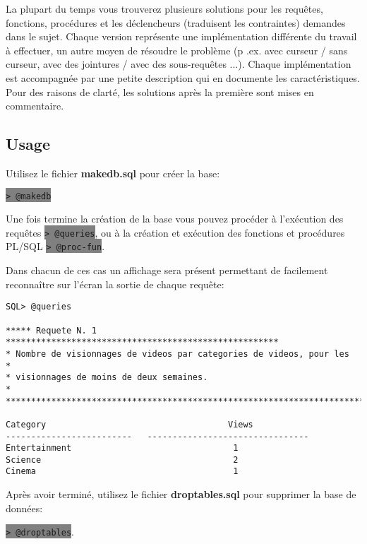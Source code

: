 \documentclass[twoside,openright,a4paper,11pt,french]{article}
\begin{document}
\bigbreak
La plupart du temps vous trouverez plusieurs solutions pour les requêtes,
fonctions, procédures et les déclencheurs (traduisent les contraintes) demandes
dans le sujet. Chaque version représente une implémentation différente du
travail à effectuer, un autre moyen de résoudre le problème (p .ex. avec
curseur / sans curseur, avec des jointures / avec des sous-requêtes ...).
Chaque implémentation est accompagnée par une petite description qui en
documente les caractéristiques. Pour des raisons de clarté, les solutions après
la première sont mises en commentaire.

\subsection{Usage}
Utilisez le fichier {\bf makedb.sql} pour créer la base:
\begin{center}
\colorbox{gray}{\lstinline[basicstyle=\ttfamily\color{black}]|> @makedb|}
\end{center}
Une fois termine la création de la base vous pouvez procéder à l'exécution des requêtes
\colorbox{gray}{\lstinline[basicstyle=\ttfamily\color{black}]|> @queries|},
ou à la création et exécution des fonctions et procédures PL/SQL
\colorbox{gray}{\lstinline[basicstyle=\ttfamily\color{black}]|> @proc-fun|}.

\smallbreak
Dans chacun de ces cas un affichage sera présent permettant de facilement
reconnaître  sur l'écran la sortie de chaque requête:

\begin{lstlisting}
SQL> @queries

***** Requete N. 1 ******************************************************
* Nombre de visionnages de videos par categories de videos, pour les            *
* visionnages de moins de deux semaines.                                        *
*************************************************************************

Category                                    Views
-------------------------   --------------------------------
Entertainment                                1
Science                                      2
Cinema                                       1
\end{lstlisting}

Après avoir terminé, utilisez le fichier {\bf droptables.sql} pour supprimer la base de données:
\begin{center}
\colorbox{gray}{\lstinline[basicstyle=\ttfamily\color{black}]|> @droptables|}.
\end{center}
\end{document}

